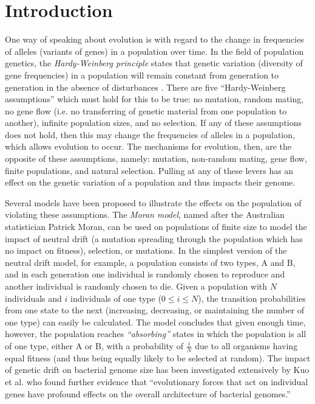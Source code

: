 \chapter{Introduction}\label{ch:01intro}

One way of speaking about evolution is with regard to the change in frequencies of alleles (variants of genes) in a population over time. In the field of population genetics, the \textit{Hardy-Weinberg principle} states that genetic variation (diversity of gene frequencies) in a population will remain constant from generation to generation in the absence of disturbances \cite{cutter2019primer}. There are five ``Hardy-Weinberg assumptions'' which must hold for this to be true: no mutation, random mating, no gene flow (i.e. no transferring of genetic material from one population to another), infinite population sizes, and no selection. If any of these assumptions does not hold, then this may change the frequencies of alleles in a population, which allows evolution to occur. The mechanisms for evolution, then, are the opposite of these assumptions, namely: mutation, non-random mating, gene flow, finite populations, and natural selection. Pulling at any of these levers has an effect on the genetic variation of a population and thus impacts their genome. 

Several models have been proposed to illustrate the effects on the population of violating these assumptions. The \textit{Moran model}, named after the Australian statistician Patrick Moran, can be used on populations of finite size to model the impact of neutral drift (a mutation spreading through the population which has no impact on fitness), selection, or mutations. In the simplest version of the neutral drift model, for example, a population consists of two types, A and B, and in each generation one individual is randomly chosen to reproduce and another individual is randomly chosen to die. Given a population with $N$ individuals and $i$ individuals of one type ($0 \leq i \leq N$), the transition probabilities from one state to the next (increasing, decreasing, or maintaining the number of one type) can easily be calculated. The model concludes that given enough time, however, the population reaches \textit{``absorbing''} states in which the population is all of one type, either A or B, with a probability of $\frac{i}{N}$ due to all organisms having equal fitness (and thus being equally likely to be selected at random). The impact of genetic drift on bacterial genome size has been investigated extensively by Kuo et al. \cite{kuo2009consequences} who found further evidence that ``evolutionary forces that act on individual genes have profound effects on the overall architecture of bacterial genomes.'' 

